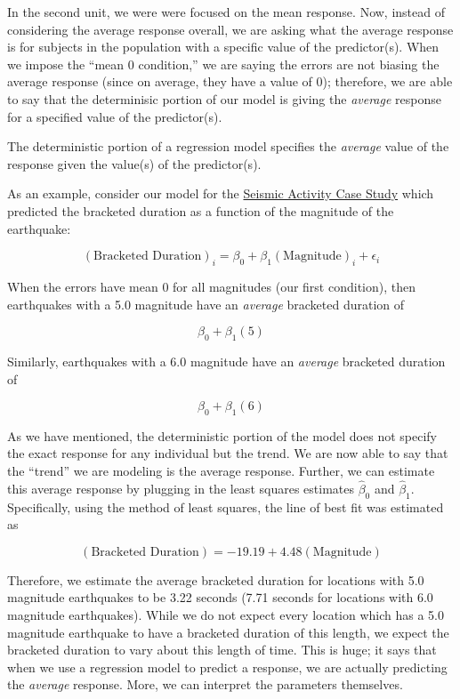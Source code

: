 \documentclass[
]{book}
\theoremstyle{plain}
\theoremstyle{mydefn}
\theoremstyle{myexmpl}
\theoremstyle{remark}
\begin{document}
In the second unit, we were were focused on the mean response. Now, instead of considering the average response overall, we are asking what the average response is for subjects in the population with a specific value of the predictor(s). When we impose the ``mean 0 condition,'' we are saying the errors are not biasing the average response (since on average, they have a value of 0); therefore, we are able to say that the determinisic portion of our model is giving the \emph{average} response for a specified value of the predictor(s).

\begin{rmdkeyidea}
The deterministic portion of a regression model specifies the \emph{average} value of the response given the value(s) of the predictor(s).
\end{rmdkeyidea}

As an example, consider our model for the \protect\hyperlink{CaseGreece}{Seismic Activity Case Study} which predicted the bracketed duration as a function of the magnitude of the earthquake:

\[(\text{Bracketed Duration})_i = \beta_0 + \beta_1(\text{Magnitude})_i + \epsilon_i\]

When the errors have mean 0 for all magnitudes (our first condition), then earthquakes with a 5.0 magnitude have an \emph{average} bracketed duration of

\[\beta_0 + \beta_1(5)\]

Similarly, earthquakes with a 6.0 magnitude have an \emph{average} bracketed duration of

\[\beta_0 + \beta_1(6)\]

As we have mentioned, the deterministic portion of the model does not specify the exact response for any individual but the trend. We are now able to say that the ``trend'' we are modeling is the average response. Further, we can estimate this average response by plugging in the least squares estimates \(\widehat{\beta}_0\) and \(\widehat{\beta}_1\). Specifically, using the method of least squares, the line of best fit was estimated as

\[(\text{Bracketed Duration}) = -19.19 + 4.48 (\text{Magnitude})\]

Therefore, we estimate the average bracketed duration for locations with 5.0 magnitude earthquakes to be 3.22 seconds (7.71 seconds for locations with 6.0 magnitude earthquakes). While we do not expect every location which has a 5.0 magnitude earthquake to have a bracketed duration of this length, we expect the bracketed duration to vary about this length of time. This is huge; it says that when we use a regression model to predict a response, we are actually predicting the \emph{average} response. More, we can interpret the parameters themselves.
\end{document}
